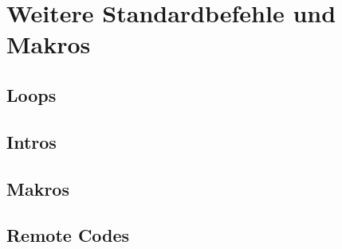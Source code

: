 \section{Weitere Standardbefehle und Makros}
\subsection{Loops}
\subsection{Intros}
\subsection{Makros}
\subsection{Remote Codes}